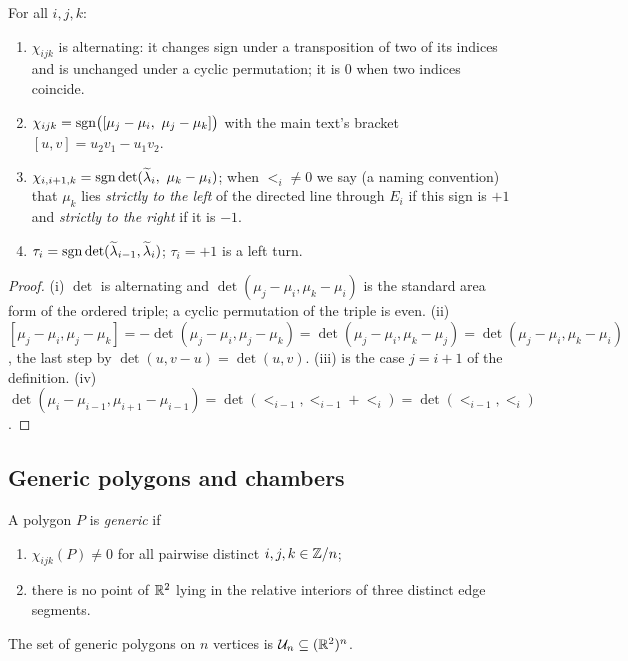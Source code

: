 \begin{lemma}\label{lem:chi-basic}
For all $i,j,k$:
\begin{enumerate}
\item[(i)] $\chi_{ijk}$ is alternating: it changes sign under a transposition
of two of its indices and is unchanged under a cyclic permutation; it is $0$
when two indices coincide.
\item[(ii)] $\chi_{ijk}=\sgn\bigl([\mu_j-\mu_i,\ \mu_j-\mu_k]\bigr)$ with the
main text's bracket $[u,v]=u_2v_1-u_1v_2$.
\item[(iii)] $\chi_{i,i+1,k}=\sgn\det(\lt_i,\ \mu_k-\mu_i)$; when $\lt_i\neq0$
we say (a naming convention) that $\mu_k$ lies \emph{strictly to the left} of
the directed line through $E_i$ if this sign is $+1$ and \emph{strictly to the
right} if it is $-1$.
\item[(iv)] $\tau_i=\operatorname{sgn}\det(\widetilde\lambda_{i-1},\widetilde\lambda_i)$; $\tau_i=+1$ is a left turn.
\end{enumerate}
\end{lemma}
\begin{proof}
(i) $\det$ is alternating and $\det(\mu_j-\mu_i,\mu_k-\mu_i)$ is the standard
area form of the ordered triple; a cyclic permutation of the triple is even.
(ii) $[\mu_j-\mu_i,\mu_j-\mu_k]=-\det(\mu_j-\mu_i,\mu_j-\mu_k)
=\det(\mu_j-\mu_i,\mu_k-\mu_j)=\det(\mu_j-\mu_i,\mu_k-\mu_i)$, the last step
by $\det(u,v-u)=\det(u,v)$. (iii) is the case $j=i+1$ of the definition.
(iv) $\det(\mu_i-\mu_{i-1},\mu_{i+1}-\mu_{i-1})=\det(\lt_{i-1},\lt_{i-1}+\lt_i)
=\det(\lt_{i-1},\lt_i)$.
\end{proof}

\subsection{Generic polygons and chambers}

\begin{definition}\label{def:generic}
A polygon $P$ is \emph{generic} if
\begin{enumerate}
\item[(G1)] $\chi_{ijk}(P)\neq0$ for all pairwise distinct $i,j,k\in\mathbb Z/n$;
\item[(G2)] there is no point of $\mathbb R^2$ lying in the relative interiors of
three distinct edge segments.
\end{enumerate}
The set of generic polygons on $n$ vertices is $\mathcal U_n\subseteq(\mathbb R^2)^n$.
\end{definition}

